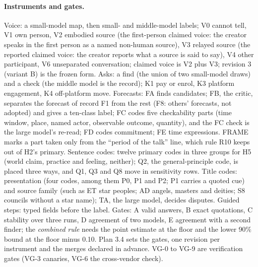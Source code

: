 \paragraph{Instruments and gates.} Voice: a small-model map, then small- and middle-model labels; V0 cannot tell, V1
own person, V2 embodied source (the first-person claimed voice: the creator speaks in the first person as a named
non-human source), V3 relayed source (the reported claimed voice: the creator reports what a source is said to
say), V4 other participant, V6 unseparated conversation; claimed voice is V2 plus V3; revision 3
(variant B) is the frozen form. Asks: a find (the union of two small-model draws) and a check (the middle model is the
record); K1 pay or enrol, K3 platform engagement, K4 off-platform move. Forecasts: FA finds candidates; FB, the critic,
separates the forecast of record F1 from the rest (F8: others' forecasts, not adopted) and gives a ten-class label; FC
codes five checkability parts (time window, place, named actor, observable outcome, quantity), and the FC check is the
large model's re-read; FD codes commitment; FE time expressions. FRAME marks a part taken only from the ``period of the
talk'' line, which rule R10 keeps out of H2's primary. Sentence codes: twelve primary codes in three groups for H5
(world claim, practice and feeling, neither); Q2, the general-principle code, is placed three ways, and Q1, Q3 and Q8
move in sensitivity rows. Title codes: presentation (four codes, among them P0, P1 and P2; P1 carries a quoted cue) and
source family (such as ET star peoples; AD angels, masters and deities; S8 councils without a star name); TA, the large
model, decides disputes. Guided steps: typed fields before the label. Gates: A valid answers, B exact quotations, C
stability over three runs, D agreement of two models, E agreement with a second finder; the \emph{combined rule} needs
the point estimate at the floor and the lower 90\% bound at the floor minus 0.10. Plan 3.4 sets the gates, one revision
per instrument and the merges declared in advance. VG-0 to VG-9 are verification gates (VG-3 canaries, VG-6 the
cross-vendor check).

